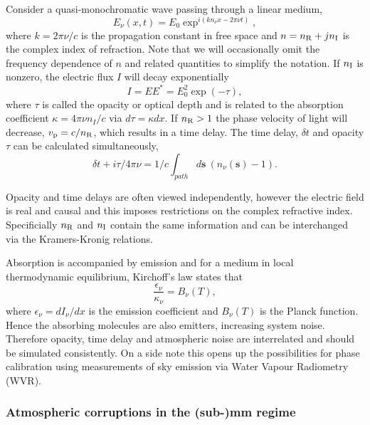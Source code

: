 Consider a quasi-monochromatic wave passing through a linear medium,
\begin{equation}
E_\nu(x,t) = E_0 \exp^{i(kn_\nu x - 2\pi\nu t)},
\end{equation}		
where $k=2\pi \nu/c$ is the propagation constant in free space and $n= n_{\rm R} + j n_{\rm I}$ is the complex index of refraction. Note that we will occasionally omit the frequency dependence of $n$ and related quantities to simplify the notation. If $n_{\rm I}$ is nonzero, the electric flux $I$ will decay exponentially
\begin{equation}
I = EE^\ast = E_0^2 \exp(-\tau),
\end{equation}
where $\tau$ is called the opacity or optical depth and is related to the absorption coefficient $\kappa = 4\pi \nu n_I/c$ via $d\tau = \kappa dx$. If $n_{\rm R} > 1 $ the phase velocity of light will decrease, $v_{\rm p} = c/n_{\rm R}$, which results in a time delay. The time delay, $\delta t$ and opacity $\tau$ can be calculated simultaneously,
\begin{equation}\label{timedelay}
\delta t + i \tau /4\pi \nu =1/c \int_{path} d\mathbf{s}\  (n_\nu(\mathbf{s}) -1).
\end{equation}


Opacity and time delays are often viewed independently, however the electric field is real and causal and this imposes restrictions on the complex refractive index. Specificially $n_{\rm R}$ and $n_{\rm I}$ contain the same information and can be interchanged via the Kramers-Kronig relations. 


Absorption is accompanied by emission and for a medium in local thermodynamic equilibrium, Kirchoff's law states that 
\begin{equation}\label{kirchoff}
\frac{\epsilon_\nu}{\kappa_\nu}=B_\nu(T),
\end{equation}
where $\epsilon_\nu = dI_\nu/dx$ is the emission coefficient and $B_\nu(T)$ is the Planck function. Hence the absorbing molecules are also emitters, increasing system noise. Therefore opacity, time delay and atmospheric noise are interrelated and should be simulated consistently. On a side note this opens up the possibilities for phase calibration using measurements of sky emission via Water Vapour Radiometry (WVR).

\subsubsection{Atmospheric corruptions in the (sub-)mm regime}

